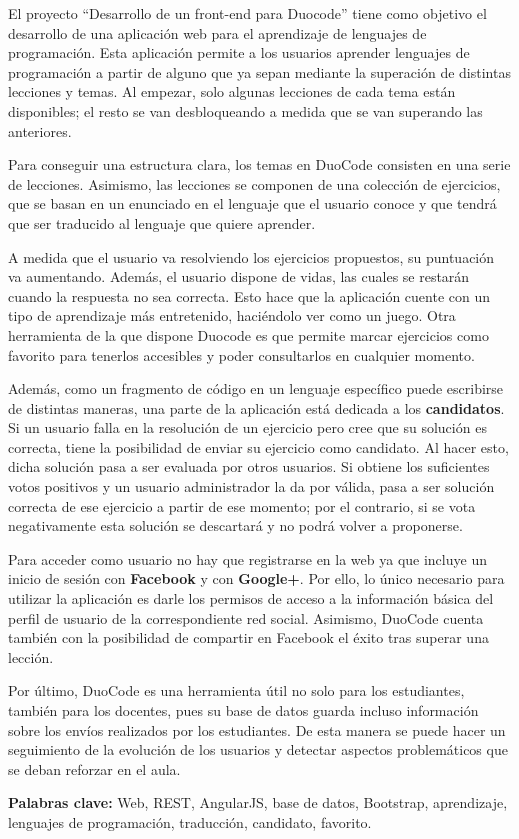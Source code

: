 
El proyecto ``Desarrollo de un front-end para Duocode'' tiene como objetivo el desarrollo de una aplicación web para el aprendizaje de lenguajes de programación. Esta aplicación permite a los usuarios aprender lenguajes de programación a partir de alguno que ya sepan mediante la superación de distintas lecciones y temas. Al empezar, solo algunas lecciones de cada tema están disponibles; el resto se van desbloqueando a medida que se van superando las anteriores.

Para conseguir una estructura clara, los temas en DuoCode consisten en una serie de lecciones. Asimismo, las lecciones se componen de una colección de ejercicios, que se basan en un enunciado en el lenguaje que el usuario conoce y que tendrá que ser traducido al lenguaje que quiere aprender.

A medida que el usuario va resolviendo los ejercicios propuestos, su puntuación va aumentando. Además, el usuario dispone de vidas, las cuales se restarán cuando la respuesta no sea correcta. Esto hace que la aplicación cuente con un tipo de aprendizaje más entretenido, haciéndolo ver como un juego. Otra herramienta de la que dispone Duocode es que permite marcar ejercicios como favorito para tenerlos accesibles y poder consultarlos en cualquier momento.

Además, como un fragmento de código en un lenguaje específico puede escribirse de distintas maneras, una parte de la aplicación está dedicada a los \textbf{candidatos}. Si un usuario falla en la resolución de un ejercicio pero cree que su solución es correcta, tiene la posibilidad de enviar su ejercicio como candidato. Al hacer esto, dicha solución pasa a ser evaluada por otros usuarios. Si obtiene los suficientes votos positivos y un usuario administrador la da por válida, pasa a ser solución correcta de ese ejercicio a partir de ese momento; por el contrario, si se vota negativamente esta solución se descartará y no podrá volver a proponerse.

Para acceder como usuario no hay que registrarse en la web ya que incluye un inicio de sesión con \textbf{Facebook} y con \textbf{Google+}. Por ello, lo único necesario para utilizar la aplicación es
darle los permisos de acceso a la información básica del perfil de usuario de la correspondiente red social. Asimismo, DuoCode cuenta también con la posibilidad de compartir en Facebook el éxito tras superar una lección.

Por último, DuoCode es una herramienta útil no solo para los estudiantes, también para los docentes, pues su base de datos guarda incluso información sobre los envíos realizados por los estudiantes. De esta manera se puede hacer un seguimiento de la evolución de los usuarios y detectar aspectos problemáticos que se deban reforzar en el aula.

\textbf{Palabras clave:} Web, REST, AngularJS, base de datos, Bootstrap, aprendizaje, lenguajes de programación, traducción, candidato, favorito.